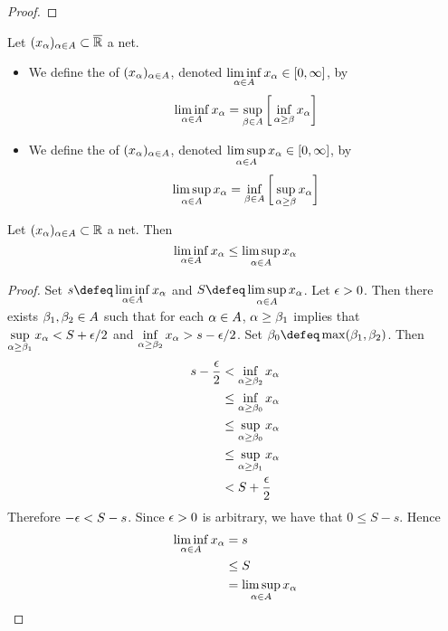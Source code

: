 \documentclass{book}
\begin{document}
	\begin{proof}
	\end{proof}
	
	
	\begin{defn}
		Let $(x_{\alpha})_{\alpha \in A} \subset \overline{\mathbb{R}}$ a net. 
		\begin{itemize}
			\item We define the  of $(x_{\alpha})_{\alpha \in A}$, denoted $\liminf \limits_{\alpha \in A} x_{\alpha} \in [0,\infty]$, by 
			$$\liminf\limits_{\alpha \in A} x_{\alpha} = \sup_{\beta \in A } \bigg[  \inf_{\alpha \geq \beta} x_{\alpha} \bigg]$$ 
			\item We define the  of $(x_{\alpha})_{\alpha \in A}$, denoted $\limsup\limits_{\alpha \in A} x_{\alpha} \in [0,\infty]$, by
			$$\limsup\limits_{\alpha \in A} x_{\alpha} = \inf_{\beta \in A } \bigg[ \sup_{\alpha \geq \beta} x_{\alpha} \bigg]$$   
		\end{itemize}
	\end{defn}

	\begin{ex}
		Let $(x_{\alpha})_{\alpha \in A} \subset \mathbb{R}$ a net. Then
		 $$\liminf\limits_{\alpha \in A} x_{\alpha} \leq \limsup\limits_{\alpha \in A} x_{\alpha}$$
	\end{ex}

	\begin{proof}
		Set $s \defeq \liminf\limits_{\al \in A} x_{\al}$ and $S \defeq \limsup\limits_{\al \in A} x_{\al}$. Let $\epsilon > 0$. Then there exists $\beta_1, \beta_2 \in A$ such that for each $\alpha \in A$, $\alpha \geq \beta_1$ implies that $\sup\limits_{\alpha \geq \beta_1} x_{\alpha} < S + \epsilon/2$ and $\inf\limits_{\alpha \geq \beta_2} x_{\alpha} > s - \epsilon/2$. Set $\be_0 \defeq \max(\be_1 , \be_2)$. Then 
		\begin{align*}
			s - \frac{\epsilon}{2}
			& < \inf\limits_{\alpha \geq \beta_2} x_{\alpha} \\
			& \leq \inf\limits_{\alpha \geq \beta_0} x_{\alpha} \\
			& \leq \sup\limits_{\alpha \geq \beta_0} x_{\alpha} \\
			& \leq \sup\limits_{\alpha \geq \beta_1} x_{\alpha} \\
			& < S + \frac{\epsilon}{2}
		\end{align*}
		Therefore $-\epsilon < S-s $. Since $\epsilon > 0$ is arbitrary, we have that $0 \leq S - s$. Hence
		\begin{align*}
			\liminf\limits_{\alpha \in A} x_{\alpha}
			& = s \\
			& \leq S \\
			& = \limsup\limits_{\alpha \in A} x_{\alpha}
		\end{align*}
	\end{proof}
\end{document}
